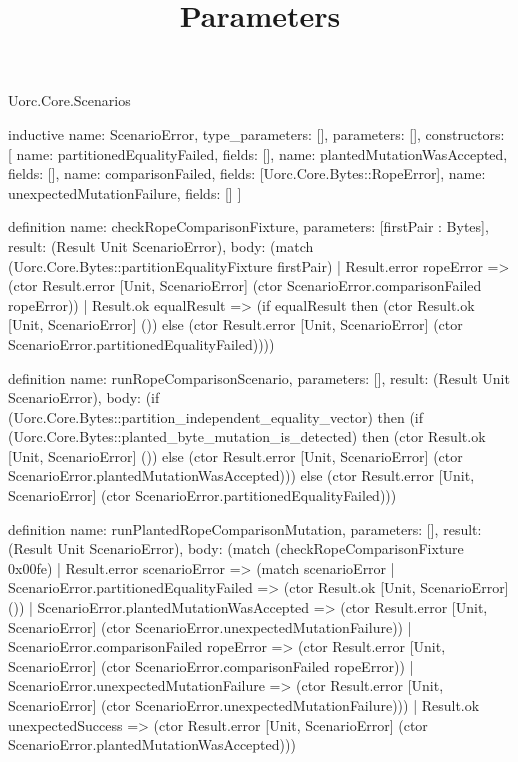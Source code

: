 \begin{lexlean}{Uorc.Core.Scenarios}
\title{Parameters}
\begin{semanticmodule}
inductive{
  name: ScenarioError,
  type_parameters: [],
  parameters: [],
  constructors: [
    {name: partitionedEqualityFailed, fields: []},
    {name: plantedMutationWasAccepted, fields: []},
    {name: comparisonFailed, fields: [Uorc.Core.Bytes::RopeError]},
    {name: unexpectedMutationFailure, fields: []}
  ]
}

definition{
  name: checkRopeComparisonFixture,
  parameters: [firstPair : Bytes],
  result: (Result Unit ScenarioError),
  body: (match (Uorc.Core.Bytes::partitionEqualityFixture firstPair)
    | Result.error ropeError => (ctor Result.error [Unit, ScenarioError] (ctor ScenarioError.comparisonFailed ropeError))
    | Result.ok equalResult => (if equalResult then (ctor Result.ok [Unit, ScenarioError] ()) else (ctor Result.error [Unit, ScenarioError] (ctor ScenarioError.partitionedEqualityFailed))))
}

definition{
  name: runRopeComparisonScenario,
  parameters: [],
  result: (Result Unit ScenarioError),
  body: (if (Uorc.Core.Bytes::partition_independent_equality_vector) then (if (Uorc.Core.Bytes::planted_byte_mutation_is_detected) then (ctor Result.ok [Unit, ScenarioError] ()) else (ctor Result.error [Unit, ScenarioError] (ctor ScenarioError.plantedMutationWasAccepted))) else (ctor Result.error [Unit, ScenarioError] (ctor ScenarioError.partitionedEqualityFailed)))
}

definition{
  name: runPlantedRopeComparisonMutation,
  parameters: [],
  result: (Result Unit ScenarioError),
  body: (match (checkRopeComparisonFixture 0x00fe)
    | Result.error scenarioError => (match scenarioError
      | ScenarioError.partitionedEqualityFailed => (ctor Result.ok [Unit, ScenarioError] ())
      | ScenarioError.plantedMutationWasAccepted => (ctor Result.error [Unit, ScenarioError] (ctor ScenarioError.unexpectedMutationFailure))
      | ScenarioError.comparisonFailed ropeError => (ctor Result.error [Unit, ScenarioError] (ctor ScenarioError.comparisonFailed ropeError))
      | ScenarioError.unexpectedMutationFailure => (ctor Result.error [Unit, ScenarioError] (ctor ScenarioError.unexpectedMutationFailure)))
    | Result.ok unexpectedSuccess => (ctor Result.error [Unit, ScenarioError] (ctor ScenarioError.plantedMutationWasAccepted)))
}
\end{semanticmodule}
\end{lexlean}
